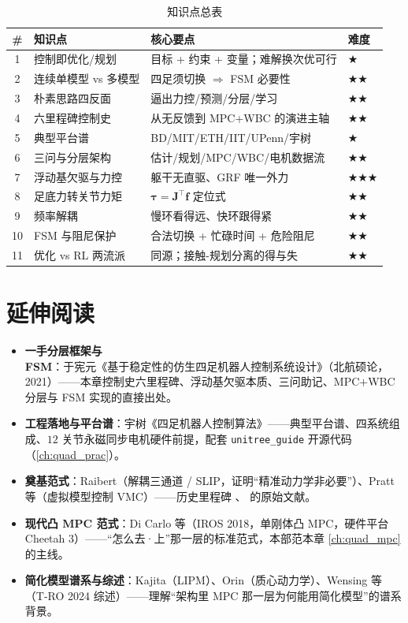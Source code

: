 \begin{table}[H]\centering\small
\caption{知识点总表}
\begin{tabular}{clll}
\toprule
\# & 知识点 & 核心要点 & 难度 \\
\midrule
1 & 控制即优化/规划 & 目标 + 约束 + 变量；难解换次优可行 & \(\bigstar\) \\
2 & 连续单模型 vs 多模型 & 四足须切换 $\Rightarrow$ FSM 必要性 & \(\bigstar\bigstar\) \\
3 & 朴素思路四反面 & 逼出力控/预测/分层/学习 & \(\bigstar\bigstar\) \\
4 & 六里程碑控制史 & 从无反馈到 MPC+WBC 的演进主轴 & \(\bigstar\bigstar\) \\
5 & 典型平台谱 & BD/MIT/ETH/IIT/UPenn/宇树 & \(\bigstar\) \\
6 & 三问与分层架构 & 估计/规划/MPC/WBC/电机数据流 & \(\bigstar\bigstar\) \\
7 & 浮动基欠驱与力控 & 躯干无直驱、GRF 唯一外力 & \(\bigstar\bigstar\bigstar\) \\
8 & 足底力转关节力矩 & $\boldsymbol\tau=\mathbf{J}^\top\mathbf{f}$ 定位式 & \(\bigstar\bigstar\) \\
9 & 频率解耦 & 慢环看得远、快环跟得紧 & \(\bigstar\bigstar\) \\
10 & FSM 与阻尼保护 & 合法切换 + 忙碌时间 + 危险阻尼 & \(\bigstar\bigstar\) \\
11 & 优化 vs RL 两流派 & 同源；接触-规划分离的得与失 & \(\bigstar\bigstar\) \\
\bottomrule
\end{tabular}
\end{table}

\section*{延伸阅读}
\begin{itemize}
  \item \textbf{一手分层框架与 FSM}：于宪元《基于稳定性的仿生四足机器人控制系统设计》\cite{yu2021quadruped}（北航硕论，2021）——本章控制史六里程碑、浮动基欠驱本质、三问助记、MPC$+$WBC 分层与 FSM 实现的直接出处。
  \item \textbf{工程落地与平台谱}：宇树《四足机器人控制算法》\cite{unitree2023quadruped}——典型平台谱、四系统组成、$12$ 关节永磁同步电机硬件前提，配套 \texttt{unitree\_guide} 开源代码（\cref{ch:quad_prac}）。
  \item \textbf{奠基范式}：Raibert\cite{raibert1986legged}（解耦三通道 / SLIP，证明“精准动力学非必要”）、Pratt 等\cite{pratt2001virtual}（虚拟模型控制 VMC）——历史里程碑 、 的原始文献。
  \item \textbf{现代凸 MPC 范式}：Di Carlo 等\cite{dicarlo2018cheetah}（IROS 2018，单刚体凸 MPC，硬件平台 Cheetah 3\cite{bledt2018cheetah3}）——“怎么去·上”那一层的标准范式，本部范本章 \cref{ch:quad_mpc} 的主线。
  \item \textbf{简化模型谱系与综述}：Kajita\cite{kajita2001lipm}（LIPM）、Orin\cite{orin2013centroidal}（质心动力学）、Wensing 等\cite{wensing2024legged}（T-RO 2024 综述）——理解“架构里 MPC 那一层为何能用简化模型”的谱系背景。
\end{itemize}

